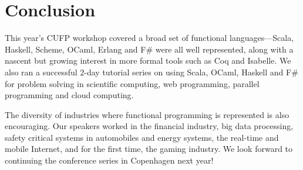 \documentclass{jfp1}
\begin{document}
\section{Conclusion}

This year's CUFP workshop covered a broad set of functional languages---Scala,
Haskell, Scheme, OCaml, Erlang and F\# were all well represented, along with a
nascent but growing interest in more formal tools such as Coq and Isabelle.  We
also ran a successful 2-day tutorial series on using Scala, OCaml, Haskell and
F\# for problem solving in scientific computing, web programming, parallel
programming and cloud computing. 

The diversity of industries where functional programming is represented is also
encouraging.  Our speakers worked in the financial industry, big data
processing, safety critical systems in automobiles and energy systems, the
real-time and mobile Internet, and for the first time, the gaming industry. We
look forward to continuing the conference series in Copenhagen next year!


\end{document}

